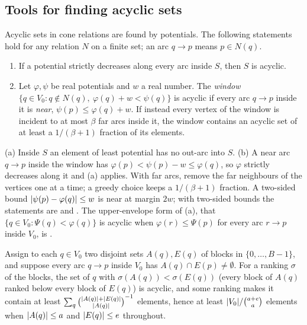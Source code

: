 \subsection{Tools for finding acyclic sets}

Acyclic sets in cone relations are found by potentials. The following statements hold for any relation $N$ on a finite set; an arc
$q\to p$ means $p\in N(q)$.

\begin{lemma}\label{lem:window}
\begin{enumerate}[label=(\alph*)]
\item If a potential strictly decreases along every arc inside $S$, then $S$ is acyclic.
\item Let $\varphi,\psi$ be real potentials and $w$ a real number. The \emph{window} $\{q\in V_0:q\notin N(q),\ \varphi(q)+w<\psi(q)\}$
is acyclic if every arc $q\to p$ inside it is \emph{near}, $\psi(p)\le\varphi(q)+w$. If instead every vertex of the window is
incident to at most $\beta$ far arcs inside it, the window contains an acyclic set of at least a $1/(\beta+1)$ fraction of its
elements.
\end{enumerate}
\end{lemma}

\begin{outline}
(a) Inside $S$ an element of least potential has no out-arc into $S$. (b) A near arc $q\to p$ inside the window has
$\varphi(p)<\psi(p)-w\le\varphi(q)$, so $\varphi$ strictly decreases along it and (a) applies. With far arcs, remove the far neighbours
of the vertices one at a time; a greedy choice keeps a $1/(\beta+1)$ fraction. A two-sided bound $\lvert \psi(p)-\varphi(q) \rvert\le w$ is
near at margin $2w$; with two-sided bounds the statements are  and
. The upper-envelope form of (a), that $\{q\in V_0:\Psi(q)<\varphi(q)\}$ is acyclic when
$\varphi(r)\le\Psi(p)$ for every arc $r\to p$ inside $V_0$, is .
\end{outline}

\begin{lemma}\label{lem:blockcut}
Assign to each $q\in V_0$ two disjoint sets $A(q),E(q)$ of blocks in $\{0,\dots,B-1\}$, and suppose every arc $q\to p$ inside $V_0$ has
$A(q)\cap E(p)\ne\emptyset$. For a ranking $\sigma$ of the blocks, the set of $q$ with $\sigma(A(q))<\sigma(E(q))$ (every block of $A(q)$
ranked below every block of $E(q)$) is acyclic, and some ranking makes it contain at least
$\sum_q\binom{\lvert A(q) \rvert+\lvert E(q) \rvert}{\lvert A(q) \rvert}^{-1}$ elements, hence at least $\lvert V_0 \rvert/\binom{a+e}{a}$ elements when
$\lvert A(q) \rvert\le a$ and $\lvert E(q) \rvert\le e$ throughout.
\end{lemma}

